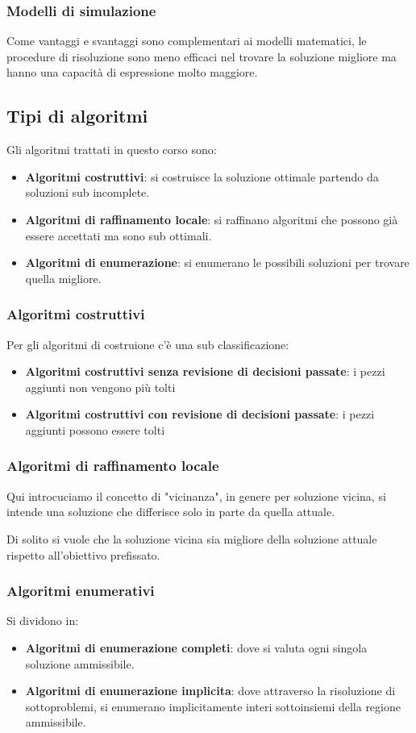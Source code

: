 \subsubsection{Modelli di simulazione}
Come vantaggi e svantaggi sono complementari ai modelli matematici, 
le procedure di risoluzione sono meno efficaci nel trovare la soluzione migliore 
ma hanno una capacità di espressione molto maggiore.

\subsection{Tipi di algoritmi}
Gli algoritmi trattati in questo corso sono:
\begin{itemize}
    \item \textbf{Algoritmi costruttivi}: si costruisce la soluzione ottimale partendo da soluzioni sub incomplete.
    \item \textbf{Algoritmi di raffinamento locale}: si raffinano algoritmi che possono già essere accettati ma sono sub ottimali.
    \item \textbf{Algoritmi di enumerazione}: si enumerano le possibili soluzioni per trovare quella migliore.
\end{itemize}

\subsubsection{Algoritmi costruttivi}
Per gli algoritmi di costruione c'è una sub classificazione:
\begin{itemize}
    \item \textbf{Algoritmi costruttivi senza revisione di decisioni passate}: i pezzi aggiunti non vengono più tolti
    \item \textbf{Algoritmi costruttivi con revisione di decisioni passate}: i pezzi aggiunti possono essere tolti
\end{itemize}

\subsubsection{Algoritmi di raffinamento locale}

Qui introcuciamo il concetto di "vicinanza", in genere per soluzione vicina, si intende
una soluzione che differisce solo in parte da quella attuale.

Di solito si vuole che la soluzione vicina sia migliore della soluzione attuale rispetto all'obiettivo prefissato.

\subsubsection{Algoritmi enumerativi}
Si dividono in:
\begin{itemize}
    \item \textbf{Algoritmi di enumerazione completi}: dove si valuta ogni singola soluzione ammissibile.
    \item \textbf{Algoritmi di enumerazione implicita}: dove attraverso la risoluzione di sottoproblemi, si enumerano implicitamente interi sottoinsiemi della regione ammissibile.
\end{itemize}


